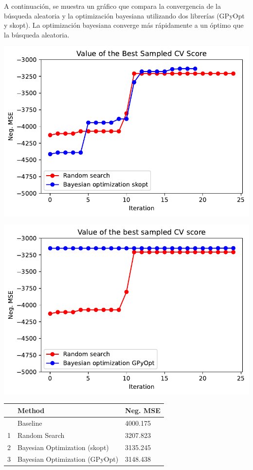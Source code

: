 \documentclass[
  12pt,
  letterpaper,
  DIV=11,
  numbers=noendperiod]{scrartcl}
\begin{document}
A continuación, se muestra un gráfico que compara la convergencia de la
búsqueda aleatoria y la optimización bayesiana utilizando dos librerías
(GPyOpt y skopt). La optimización bayesiana converge más rápidamente a
un óptimo que la búsqueda aleatoria.

\includegraphics{ProyFinal_OptBayesiana_2024_files/figure-pdf/cell-16-output-1.pdf}

\includegraphics{ProyFinal_OptBayesiana_2024_files/figure-pdf/cell-17-output-1.pdf}

\begin{longtable}[]{@{}lll@{}}
\toprule\noalign{}
& Method & Neg. MSE \\
\midrule\noalign{}
\endhead
\bottomrule\noalign{}
\endlastfoot
0 & Baseline & 4000.175 \\
1 & Random Search & 3207.823 \\
2 & Bayesian Optimization (skopt) & 3135.245 \\
3 & Bayesian Optimization (GPyOpt) & 3148.438 \\
\end{longtable}
\end{document}
